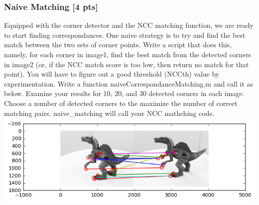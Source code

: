 \documentclass[11pt]{article}
\makeatletter
\def\maxwidth{\ifdim\Gin@nat@width>\linewidth\linewidth
    \else\Gin@nat@width\fi}
\let\Oldincludegraphics\includegraphics
\renewcommand{\includegraphics}[1]{\Oldincludegraphics[width=.8\maxwidth]{#1}}
\makeatother
\begin{document}
    \hypertarget{naive-matching-4-pts}{%
\subsubsection{Naive Matching {[}4 pts{]}}\label{naive-matching-4-pts}}

Equipped with the corner detector and the NCC matching function, we are
ready to start finding correspondances. One naive strategy is to try and
find the best match between the two sets of corner points. Write a
script that does this, namely, for each corner in image1, find the best
match from the detected corners in image2 (or, if the NCC match score is
too low, then return no match for that point). You will have to figure
out a good threshold (NCCth) value by experimentation. Write a function
naiveCorrespondanceMatching.m and call it as below. Examine your results
for 10, 20, and 30 detected corners in each image. Choose a number of
detected corners to the maximize the number of correct matching pairs.
naive\_matching will call your NCC mathching code.
\includegraphics{fig/dinoMatch.png}
\end{document}
